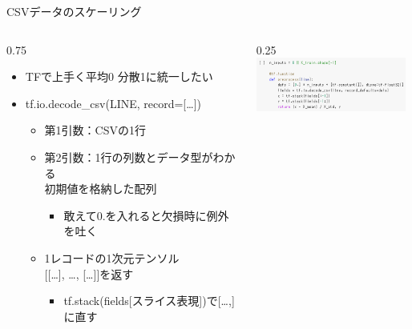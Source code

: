 \documentclass[aspectratio=169, dvipdfmx, 14pt, xcolor={svgnames,dvipsnames}, t]{beamer}
\newlength{\mytotalwidth}
\newlength{\mycolumnwidth}
\begin{document}

\begin{frame}{CSVデータのスケーリング}
  \begin{columns}[totalwidth=\mytotalwidth]
    \begin{column}[t]{0.75\mycolumnwidth}

      \begin{itemize}
        \tightlist
        \item
              TFで上手く平均0 分散1に統一したい
        \item
              tf.io.decode\_csv(LINE, record={[}\ldots{]})

              \begin{itemize}
                \tightlist
                \item
                      第1引数：CSVの1行
                \item
                      第2引数：1行の列数とデータ型がわかる\\
                      初期値を格納した配列

                      \begin{itemize}
                        \tightlist
                        \item
                              敢えて0.を入れると欠損時に例外を吐く
                      \end{itemize}
                \item
                      \alert{1レコードの1次元テンソル\\
                      {[}{[}\ldots{]}, \ldots, {[}\ldots{]}{]}を返す}

                      \begin{itemize}
                        \tightlist
                        \item
                              tf.stack(fields{[}スライス表現{]})で{[}\ldots,{]}に直す
                      \end{itemize}
              \end{itemize}
      \end{itemize}
    \end{column}

    \begin{column}[T]{0.25\mycolumnwidth}
      \includegraphics[width=140pt]{img/hands-on-ml_13-1-3_1.png}
    \end{column}
  \end{columns}

\end{frame}
\end{document}
